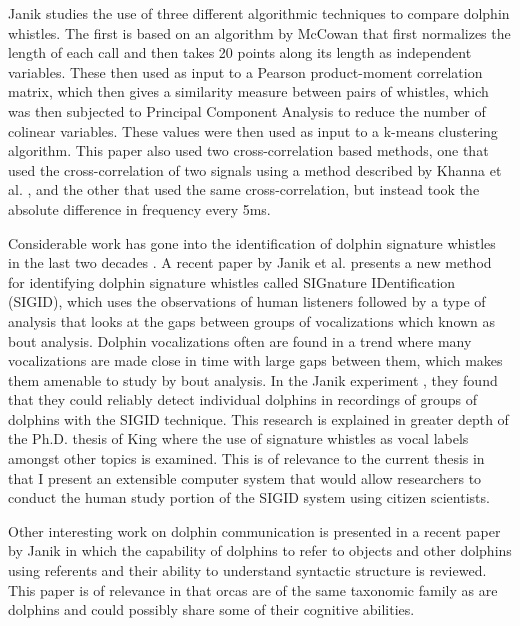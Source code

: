 Janik \cite{janik1999pitfalls} studies the use of three different
algorithmic techniques to compare dolphin whistles.  The first is
based on an algorithm by McCowan \cite{mccowan1995quantitative} that
first normalizes the length of each call and then takes 20 points
along its length as independent variables.  These then used as input
to a Pearson product-moment correlation matrix, which then gives a
similarity measure between pairs of whistles, which was then subjected
to Principal Component Analysis to reduce the number of colinear
variables.  These values were then used as input to a k-means
clustering algorithm.  This paper also used two cross-correlation
based methods, one that used the cross-correlation of two signals using
a method described by Khanna et al. \cite{khanna1997crosscorrelation},
and the other that used the same cross-correlation, but instead took
the absolute difference in frequency every 5ms.

Considerable work has gone into the identification of dolphin
signature whistles in the last two decades \cite{sayigh1990signature}.
A recent paper by Janik et al. \cite{janik2013signature} presents a
new method for identifying dolphin signature whistles called SIGnature
IDentification (SIGID), which uses the observations of human listeners
followed by a type of analysis that looks at the gaps between groups
of vocalizations which known as bout
analysis\cite{slater1982minimising}.  Dolphin vocalizations often are
found in a trend where many vocalizations are made close in time with
large gaps between them, which makes them amenable to study by bout
analysis.  In the Janik experiment \cite{janik2013signature}, they
found that they could reliably detect individual dolphins in
recordings of groups of dolphins with the SIGID technique.  This
research is explained in greater depth of the Ph.D. thesis of King
\cite{king2012imitation} where the use of signature whistles as vocal
labels amongst other topics is examined.  This is of relevance to the
current thesis in that I present an extensible computer system that
would allow researchers to conduct the human study portion of the
SIGID system using citizen scientists.

Other interesting work on dolphin communication is presented in a
recent paper by Janik \cite{janik2013cognitive} in which the
capability of dolphins to refer to objects and other dolphins using
referents and their ability to understand syntactic structure is
reviewed.  This paper is of relevance in that orcas are of the same
taxonomic family as are dolphins and could possibly share some of
their cognitive abilities.

